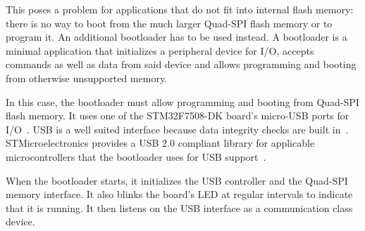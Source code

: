 This poses a problem for applications that do not fit into internal flash memory: there is no way to
boot from the much larger Quad-SPI flash memory or to program it. An additional bootloader has to be
used instead. A bootloader is a minimal application that initializes a peripheral device for I/O,
accepts commands as well as data from said device and allows programming and booting from otherwise
unsupported memory.

In this case, the bootloader must allow programming and booting from Quad-SPI flash memory. It uses
one of the STM32F7508-DK board's micro-USB ports for I/O~\cite{board-user-manual}. USB is a well
suited interface because data integrity checks are built in~\cite{usb-2-spec}. STMicroelectronics
provides a USB 2.0 compliant library for applicable microcontrollers that the bootloader uses for
USB support~\cite{stm32-usb-lib}.

When the bootloader starts, it initializes the USB controller and the Quad-SPI memory interface. It
also blinks the board's LED at regular intervals to indicate that it is running. It then listens on
the USB interface as a communication class device.

